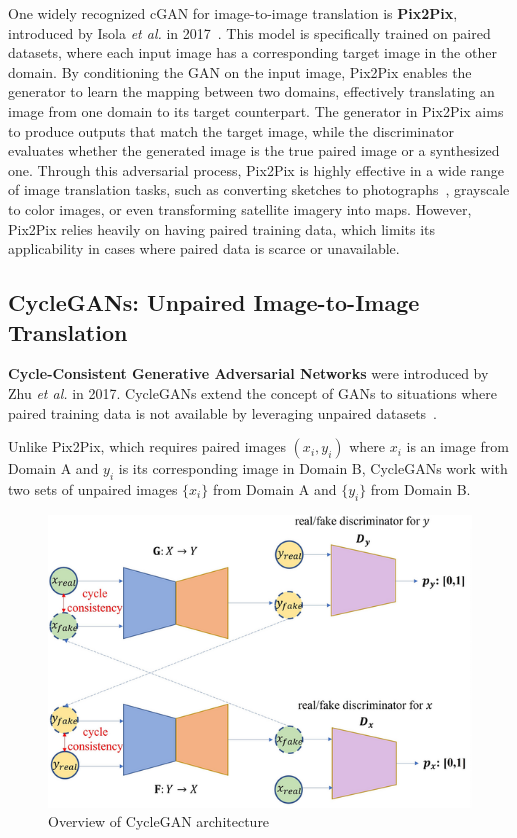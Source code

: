 \documentclass[12pt,DIV14,BCOR12mm,a4paper,footinclude=false,headinclude,parskip=half-,twoside,openright,cleardoublepage=empty,toc=index,bibliography=totoc,listof=totoc]{scrreprt}
\numberwithin{equation}{chapter}
\begin{document}
One widely recognized cGAN for image-to-image translation is \textbf{Pix2Pix}, introduced by Isola \textit{et al.} in 2017~\cite{isola2017image}. This model is specifically trained on paired datasets, where each input image has a corresponding target image in the other domain. By conditioning the GAN on the input image, Pix2Pix enables the generator to learn the mapping between two domains, effectively translating an image from one domain to its target counterpart. The generator in Pix2Pix aims to produce outputs that match the target image, while the discriminator evaluates whether the generated image is the true paired image or a synthesized one. Through this adversarial process, Pix2Pix is highly effective in a wide range of image translation tasks, such as converting sketches to photographs~\cite{sangkloy2017scribbler}, grayscale to color images, or even transforming satellite imagery into maps. However, Pix2Pix relies heavily on having paired training data, which limits its applicability in cases where paired data is scarce or unavailable.
\subsection{CycleGANs: Unpaired Image-to-Image Translation}
\textbf{Cycle-Consistent Generative Adversarial Networks} were introduced by Zhu \textit{et al.} in 2017. CycleGANs extend the concept of GANs to situations where paired training data is not available by leveraging unpaired datasets~\cite{zhu2017unpaired}.

Unlike Pix2Pix, which requires paired images \((x_i, y_i)\) where \(x_i\) is an image from Domain A and \(y_i\) is its corresponding image in Domain B, CycleGANs work with two sets of unpaired images \(\{x_i\}\) from Domain A and \(\{y_i\}\) from Domain B.

\begin{figure}
	\centering
	\includegraphics[scale=.7]{../media/Overview-of-CycleGAN-architecture.png}
	\caption{Overview of CycleGAN architecture~\cite{article}}
	\label{cycleGAN}
\end{figure}
\end{document}
